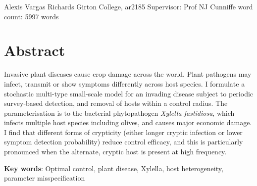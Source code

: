 \documentclass[11pt,letterpaper]{article}
\begin{document}
\vspace*{0.2in}

\begin{flushleft}
{\Large
\textbf{} %
}
\newline

Alexis Vargas Richards 
\bigskip
\newline Girton College, ar2185
\newline
Supervisor: Prof NJ Cunniffe 
\newline word count: 5997 words 
\bigskip


\end{flushleft}

\newpage
\section*{Abstract}

Invasive plant diseases cause crop damage across the world. Plant pathogens may infect, transmit or show symptoms differently across host species. I formulate a stochastic multi-type small-scale model for an invading disease subject to periodic survey-based detection, and removal of hosts within a control radius. The parameterisation is to the bacterial phytopathogen \emph{Xylella fastidiosa}, which infects multiple host species including olives, and causes major economic damage. I find that different forms of crypticity (either longer cryptic infection or lower symptom detection probability) reduce control efficacy, and this is particularly pronounced when the alternate, cryptic host is present at high frequency.


\bigskip


\textbf{Key words}: Optimal control, plant disease, Xylella, host heterogeneity, parameter misspecification
\end{document}
